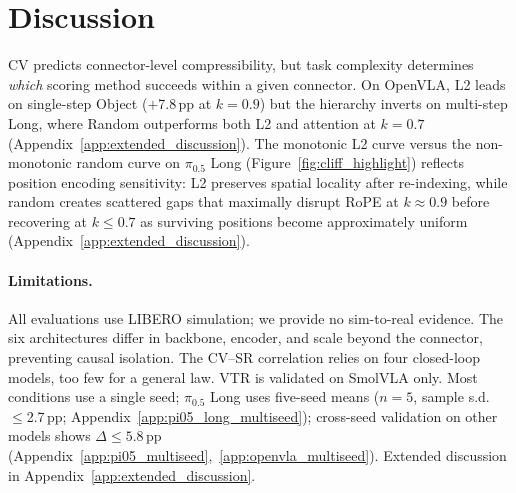 \section{Discussion}
\label{sec:analysis}

CV predicts connector-level compressibility, but task complexity determines \emph{which} scoring method succeeds within a given connector. On OpenVLA, L2 leads on single-step Object ($+$7.8\,pp at $k{=}0.9$) but the hierarchy inverts on multi-step Long, where Random outperforms both L2 and attention at $k{=}0.7$ (Appendix~\ref{app:extended_discussion}). The monotonic L2 curve versus the non-monotonic random curve on $\pi_{0.5}$ Long (Figure~\ref{fig:cliff_highlight}) reflects position encoding sensitivity: L2 preserves spatial locality after re-indexing, while random creates scattered gaps that maximally disrupt RoPE at $k{\approx}0.9$ before recovering at $k{\leq}0.7$ as surviving positions become approximately uniform (Appendix~\ref{app:extended_discussion}).

\paragraph{Limitations.}
All evaluations use LIBERO simulation; we provide no sim-to-real evidence. The six architectures differ in backbone, encoder, and scale beyond the connector, preventing causal isolation. The CV--SR correlation relies on four closed-loop models, too few for a general law. VTR is validated on SmolVLA only. Most conditions use a single seed; $\pi_{0.5}$ Long uses five-seed means ($n{=}5$, sample s.d.\ ${\leq}$2.7\,pp; Appendix~\ref{app:pi05_long_multiseed}); cross-seed validation on other models shows $\Delta \leq 5.8$\,pp (Appendix~\ref{app:pi05_multiseed},~\ref{app:openvla_multiseed}). Extended discussion in Appendix~\ref{app:extended_discussion}.
